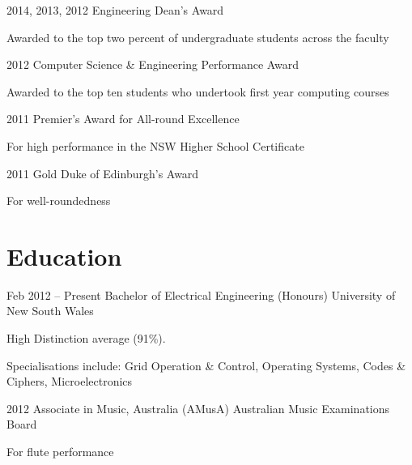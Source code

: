 \documentclass[a4paper]{friggeri-cv} %
\newcommand\shortdot[1]{
\vspace{-\parsep}
\vspace{-1em}
\begin{itemize*}
#1
\end{itemize*} 
}
\begin{document}

\entry
{2014, 2013, 2012}
{Engineering Dean's Award}
{}
{\shortdot{\item Awarded to the top two percent of undergraduate students across the faculty}}



\entry
{2012}
{Computer Science \& Engineering Performance Award}
{}
{\shortdot{\item Awarded to the top ten students who undertook first year computing courses}}




\entry
{2011}
{Premier's Award for All-round Excellence}
{}
{\shortdot{\item For high performance in the NSW Higher School Certificate}}



\entry
{2011}
{Gold Duke of Edinburgh's Award}
{}
{\shortdot{\item For well-roundedness}}







\section{Education} %




\entry
{Feb 2012 -- Present}
{Bachelor of Electrical Engineering (Honours)}
{University of New South Wales}
{%
\shortdot{
   \item High Distinction average (91\%).
   \item Specialisations include: Grid Operation \& Control, Operating Systems, Codes \& Ciphers, Microelectronics
}
}




\entry
{2012}
{Associate in Music, Australia {\normalfont (AMusA)}}
{Australian Music Examinations Board}
{\shortdot{
   \item For flute performance}
}
\end{document}
